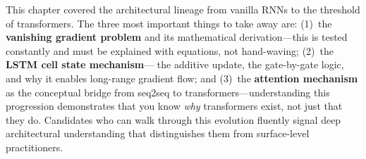 \bigskip
\begin{keyinsight}
This chapter covered the architectural lineage from vanilla RNNs to the
threshold of transformers.  The three most important things to take away
are: (1)~the \textbf{vanishing gradient problem} and its mathematical
derivation---this is tested constantly and must be explained with
equations, not hand-waving; (2)~the \textbf{LSTM cell state mechanism}---
the additive update, the gate-by-gate logic, and why it enables
long-range gradient flow; and (3)~the \textbf{attention mechanism} as the
conceptual bridge from seq2seq to transformers---understanding this
progression demonstrates that you know \emph{why} transformers exist, not
just that they do.  Candidates who can walk through this evolution
fluently signal deep architectural understanding that distinguishes them
from surface-level practitioners.
\end{keyinsight}
